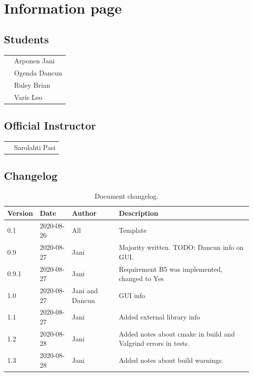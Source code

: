 \section{Information page}
\subsection*{Students}
\begin{tabular}{ll}
   & Arponen Jani \\
   & Ogenda Dancun \\
   & Ruley Brian \\
   & Varis Leo \\
\end{tabular}

\subsection*{Official Instructor}
\begin{tabular}{ll}
   & Sarolahti Pasi \\
\end{tabular}



\subsection*{Changelog}
\begin{table}[!h]
\small{
\begin{tabular}{l|l|l|l}
\textbf{Version} & \textbf{Date} & \textbf{Author} & \textbf{Description} \\
\hline
0.1 & 2020-08-26 & All & Template \\
0.9 & 2020-08-27 & Jani & Majority written. TODO: Dancun info on GUI.\\
0.9.1 & 2020-08-27 & Jani & Requirement B5 was implemented, changed to Yes \\
1.0 & 2020-08-27 & Jani and Dancun & GUI info \\
1.1 & 2020-08-27 & Jani & Added external library info \\
1.2 & 2020-08-28 & Jani & Added notes about cmake in build and Valgrind errors in tests.\\
1.3 & 2020-08-28 & Jani & Added notes about build warnings. \\
\end{tabular}
}
\caption{Document changelog.}
\label{table:changelog}
\end{table}


